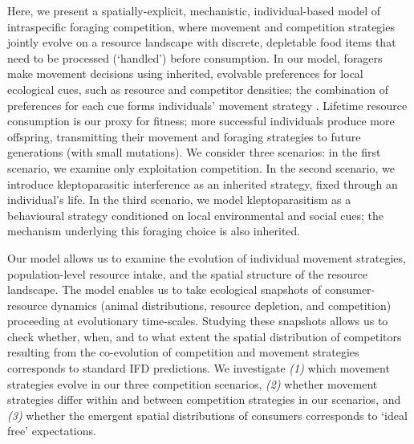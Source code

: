     Here, we present a spatially-explicit, mechanistic, individual-based model of intraspecific foraging competition, where movement and competition strategies jointly evolve on a resource landscape with discrete, depletable food items that need to be processed (`handled') before consumption.
    In our model, foragers make movement decisions using inherited, evolvable preferences for local ecological cues, such as resource and competitor densities; the combination of preferences for each cue forms individuals' movement strategy \citep[similar to relative step-selection:][]{fortin2005, avgar2016}.
    Lifetime resource consumption is our proxy for fitness; more successful individuals produce more offspring, transmitting their movement and foraging strategies to future generations (with small mutations).
    We consider three scenarios: in the first scenario, we examine only exploitation competition.
    In the second scenario, we introduce kleptoparasitic interference as an inherited strategy, fixed through an individual's life.
    In the third scenario, we model kleptoparasitism as a behavioural strategy conditioned on local environmental and social cues; the mechanism underlying this foraging choice is also inherited.

    Our model allows us to examine the evolution of individual movement strategies, population-level resource intake, and the spatial structure of the resource landscape.
    The model enables us to take ecological snapshots of consumer-resource dynamics (animal distributions, resource depletion, and competition) proceeding at evolutionary time-scales.
    Studying these snapshots allows us to check whether, when, and to what extent the spatial distribution of competitors resulting from the co-evolution of competition and movement strategies corresponds to standard IFD predictions.
    We investigate \textit{(1)} which movement strategies evolve in our three competition scenarios, \textit{(2)} whether movement strategies differ within and between competition strategies in our scenarios, and \textit{(3)} whether the emergent spatial distributions of consumers corresponds to `ideal free' expectations.
    
    \begin{refcontext}[sorting=nyt]
        \printbibliography[heading=subbibliography,sorting=nyt]
    \end{refcontext}
